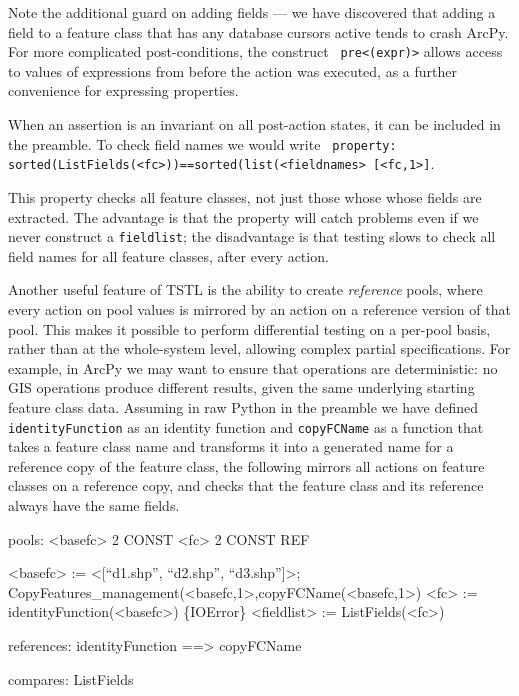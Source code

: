 Note the additional guard on adding fields --- we have discovered that
adding a field to a feature class that has any database cursors active
tends to crash ArcPy.  For more complicated post-conditions, the construct {\tt
  pre<(expr)>} allows access to values of expressions from before the
action was executed, as a further convenience for expressing properties.

When an assertion is an invariant on all post-action states, it can be
included in the preamble.  To check field names we would write {\tt
  property: sorted(ListFields(<fc>))==sorted(list(<fieldnames>
  [<fc,1>]}.

This property checks all feature classes, not just those whose
whose fields are extracted.  The advantage is that the property will
catch problems even if we never construct a {\tt fieldlist}; the
disadvantage is that testing slows to check all field names for all
feature classes, after every action.

Another useful feature of TSTL is the ability to create
\emph{reference} pools, where every action on pool values is mirrored
by an action on a reference version of that pool.  This makes it
possible to perform differential testing \cite{Differential} on a
per-pool basis, rather than at the whole-system level, allowing
complex partial specifications.  For example, in ArcPy we may want to
ensure that operations are deterministic: no GIS operations produce
different results, given the same underlying starting feature class
data.  Assuming in raw Python in the preamble we have defined {\tt
  identityFunction} as an identity function and {\tt copyFCName} as a
function that takes a feature class name and transforms it into a
generated name for a reference copy of the feature class, the
following mirrors all actions on feature classes on a reference copy,
and checks that the feature class and its reference always have the
same fields.

{\scriptsize
\begin{code}
pools:
  <basefc> 2 CONST
  <fc> 2 CONST REF

<basefc> := <[``d1.shp'', ``d2.shp'', ``d3.shp'']>; \\
  CopyFeatures\_management(<basefc,1>,copyFCName(<basefc,1>)
<fc> := identityFunction(<basefc>)
\{IOError\} <fieldlist> := ListFields(<fc>)

references:
  identityFunction ==> copyFCName

compares:
  ListFields
\end{code}
}

